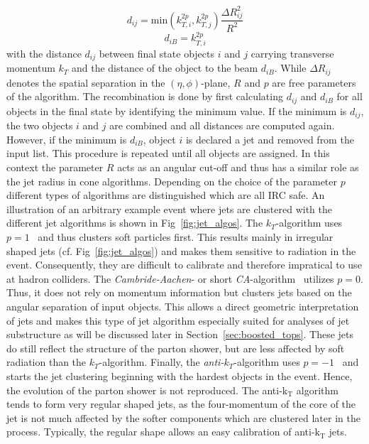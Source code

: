 \begin{description}
\begin{equation*}
d_{ij} = \mathrm{min}(k_{T,i}^{2p}, k_{T,j}^{2p}) \frac{\Delta R_{ij}^2}{R^2}
\end{equation*}
\begin{equation*}
d_{iB} = k_{T,i}^{2p}
\end{equation*}
with the distance $d_{ij}$ between final state objects $i$ and $j$ carrying transverse momentum $k_T$ and the distance of the object to the beam $d_{iB}$. While $\Delta R_{ij}$ denotes the spatial separation in the $(\eta, \phi)$-plane, $R$ and $p$ are free parameters of the algorithm. The recombination is done by first calculating $d_{ij}$ and $d_{iB}$ for all objects in the final state by identifying the minimum value. If the minimum is $d_{ij}$, the two objects $i$ and $j$ are combined and all distances are computed again. However, if the minimum is $d_{iB}$, object $i$ is declared a jet and removed from the input list. This procedure is repeated until all objects are assigned. In this context the parameter $R$ acts as an angular cut-off and thus has a similar role as the jet radius in cone algorithms. Depending on the choice of the parameter $p$ different types of algorithms are distinguished which are all IRC safe. An illustration of an arbitrary example event where jets are clustered with the different jet algorithms is shown in Fig~\ref{fig:jet_algos}. The $k_T$-algorithm uses $p = 1$~\cite{PhysRevD.48.3160} and thus clusters soft particles first. This results mainly in irregular shaped jets (cf. Fig~\ref{fig:jet_algos}) and makes them sensitive to radiation in the event. Consequently, they are difficult to calibrate and therefore impratical to use at hadron colliders. The \textit{Cambride-Aachen}- or short \textit{CA}-algorithm~\cite{Dokshitzer:1997in, Wobisch:1998wt} utilizes $p = 0$. Thus, it does not rely on momentum information but clusters jets based on the angular separation of input objects. This allows a direct geometric interpretation of jets and makes this type of jet algorithm especially suited for analyses of jet substructure as will be discussed later in Section~\ref{sec:boosted_tops}. These jets do still reflect the structure of the parton shower, but are less affected by soft radiation than the $k_T$-algorithm. Finally, the \textit{anti-$k_T$}-algorithm uses $p = -1$~\cite{1126-6708-2008-04-063} and starts the jet clustering beginning with the hardest objects in the event. Hence, the evolution of the parton shower is not reproduced. The anti-$\mathrm{k_T}$ algorithm tends to form very regular shaped jets, as the four-momentum of the core of the jet is not much affected by the softer components which are clustered later in the process. Typically, the regular shape allows an easy calibration of anti-$\mathrm{k_T}$ jets.  
\end{description}

